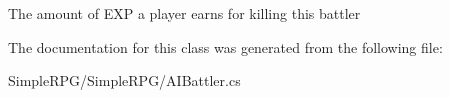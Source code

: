 The amount of E\-X\-P a player earns for killing this battler 



The documentation for this class was generated from the following file\-:\begin{DoxyCompactItemize}
\item 
Simple\-R\-P\-G/\-Simple\-R\-P\-G/A\-I\-Battler.\-cs\end{DoxyCompactItemize}
